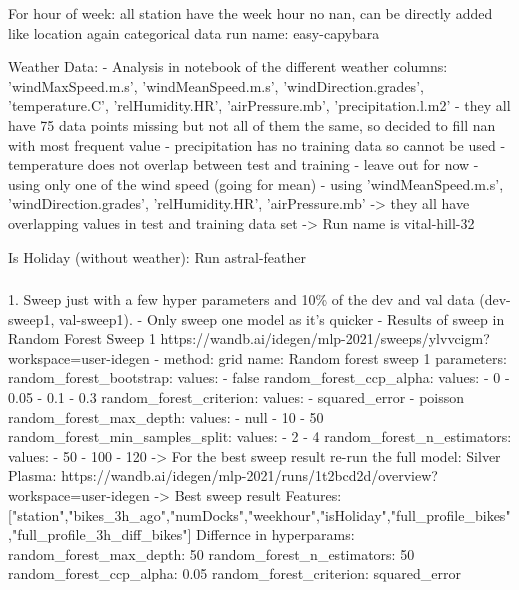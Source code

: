 \documentclass[a4paper]{article}
\begin{document}
    For hour of week: all station have the week hour no nan, can be directly added like location again categorical data
    run name: easy-capybara

    Weather Data:
    - Analysis in notebook of the different weather columns: 'windMaxSpeed.m.s', 'windMeanSpeed.m.s', 'windDirection.grades',
    'temperature.C', 'relHumidity.HR', 'airPressure.mb', 'precipitation.l.m2'
    - they all have 75 data points missing but not all of them the same, so decided to fill nan with most frequent value
    - precipitation has no training data so cannot be used
    - temperature does not overlap between test and training - leave out for now
    - using only one of the wind speed (going for mean)
    - using 'windMeanSpeed.m.s', 'windDirection.grades', 'relHumidity.HR', 'airPressure.mb' -> they all have overlapping values
    in test and training data set
    -> Run name is vital-hill-32

    Is Holiday (without weather): Run astral-feather


    \subsubsection*{}

    1. Sweep just with a few hyper parameters and 10\% of the dev and val data (dev-sweep1, val-sweep1).
    - Only sweep one model as it's quicker
    - Results of sweep in Random Forest Sweep 1 https://wandb.ai/idegen/mlp-2021/sweeps/ylvvcigm?workspace=user-idegen
    - method: grid
    name: Random forest sweep 1
    parameters:
    random\_forest\_bootstrap:
    values:
    - false
    random\_forest\_ccp\_alpha:
    values:
    - 0
    - 0.05
    - 0.1
    - 0.3
    random\_forest\_criterion:
    values:
    - squared\_error
    - poisson
    random\_forest\_max\_depth:
    values:
    - null
    - 10
    - 50
    random\_forest\_min\_samples\_split:
    values:
    - 2
    - 4
    random\_forest\_n\_estimators:
    values:
    - 50
    - 100
    - 120
    -> For the best sweep result re-run the full model:
    Silver Plasma: https://wandb.ai/idegen/mlp-2021/runs/1t2bcd2d/overview?workspace=user-idegen
    -> Best sweep result
    Features:
    ["station","bikes\_3h\_ago","numDocks","weekhour","isHoliday","full\_profile\_bikes","full\_profile\_3h\_diff\_bikes"]
    Differnce in hyperparams:
    random\_forest\_max\_depth: 50
    random\_forest\_n\_estimators: 50
    random\_forest\_ccp\_alpha: 0.05
    random\_forest\_criterion: squared\_error
\end{document}
